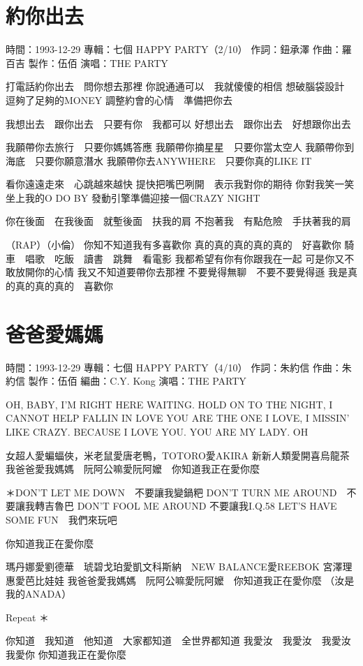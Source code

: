 \documentclass[UTF8,a4paper,oneside,twocolumn,12pt]{ctexbook}
\newcommand{\infopair}[2]{\textbullet #1：#2}
\newcommand{\zc}[1][伍佰]{\infopair{作詞}{#1}}
\newcommand{\zq}[1][伍佰]{\infopair{作曲}{#1}}
\newcommand{\bq}[1][伍佰]{\infopair{編曲}{#1}}
\newcommand{\zj}[1]{\infopair{專輯}{#1}}
\newcommand{\zz}[1]{\infopair{製作}{#1}}
\newcommand{\sj}[1]{\infopair{時間}{#1}}
\newenvironment{info}{\begin{flushleft}\kaishu
	}
	{\end{flushleft}\normalsize\yahei\par}
\newenvironment{lyric}{
	}
{}
\begin{document}
\section{約你出去}
\begin{info}
	\sj{1993-12-29}
	\zj{七個 HAPPY PARTY（2/10）}
	\zc[鈕承澤]
	\zq[羅百吉]
	\zz{伍佰}
	\infopair{演唱}{THE PARTY}
\end{info}
\begin{lyric}
	打電話約你出去　問你想去那裡
	你說通通可以　我就傻傻的相信
	想破腦袋設計　逗夠了足夠的MONEY
	調整約會的心情　準備把你去

	我想出去　跟你出去　只要有你　我都可以
	好想出去　跟你出去　好想跟你出去

	我願帶你去旅行　只要你媽媽答應
	我願帶你摘星星　只要你當太空人
	我願帶你到海底　只要你願意潛水
	我願帶你去ANYWHERE　只要你真的LIKE IT

	看你遠遠走來　心跳越來越快
	提快把嘴巴咧開　表示我對你的期待
	你對我笑一笑　坐上我的O DO BY
	發動引擎準備迎接一個CRAZY NIGHT

	你在後面　在我後面　就塹後面　扶我的肩
	不抱著我　有點危險　手扶著我的肩

	（RAP）（小倫）
	你知不知道我有多喜歡你
	真的真的真的真的真的　好喜歡你
	騎車　唱歌　吃飯　讀書　跳舞　看電影
	我都希望有你有你跟我在一起
	可是你又不敢放開你的心情
	我又不知道要帶你去那裡
	不要覺得無聊　不要不要覺得遜
	我是真的真的真的真的　喜歡你
\end{lyric}

\section{爸爸愛媽媽}
\begin{info}
	\sj{1993-12-29}
	\zj{七個 HAPPY PARTY（4/10）}
	\zc[朱約信]
	\zq[朱約信]
	\zz{伍佰}
	\bq[C.Y. Kong]
	\infopair{演唱}{THE PARTY}
\end{info}
\begin{lyric}
	OH, BABY, I'M RIGHT HERE WAITING. HOLD ON TO
	THE NIGHT, I CANNOT HELP FALLIN IN LOVE
	YOU ARE THE ONE I LOVE, I MISSIN' LIKE CRAZY.
	BECAUSE I LOVE YOU.
	YOU ARE MY LADY. OH

	女超人愛蝙蝠俠，米老鼠愛唐老鴨，TOTORO愛AKIRA
	新新人類愛開喜烏龍茶
	我爸爸愛我媽媽　阮阿公嘛愛阮阿嬤　你知道我正在愛你麼

	＊DON'T LET ME DOWN　不要讓我變鍋粑
	DON'T TURN ME AROUND　不要讓我轉吉魯巴
	DON'T FOOL ME AROUND 不要讓我I.Q.58
	LET'S HAVE SOME FUN　我們來玩吧

	你知道我正在愛你麼

	瑪丹娜愛劉德華　琥碧戈珀愛凱文科斯納　NEW BALANCE愛REEBOK
	宮澤理惠愛芭比娃娃
	我爸爸愛我媽媽　阮阿公嘛愛阮阿嬤　你知道我正在愛你麼
	（汝是我的ANADA）

	Repeat ＊

	你知道　我知道　他知道　大家都知道　全世界都知道
	我愛汝　我愛汝　我愛汝　我愛你
	你知道我正在愛你麼
\end{lyric}
\end{document}
